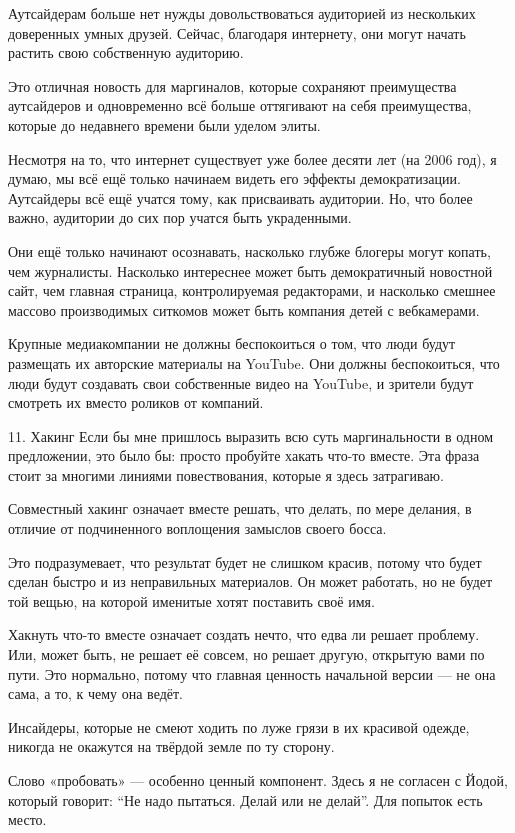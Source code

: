 \documentclass[ebook,12pt,oneside,openany]{memoir}
\begin{document}
Аутсайдерам больше нет нужды довольствоваться аудиторией из нескольких
доверенных умных друзей. Сейчас, благодаря интернету, они могут начать
растить свою собственную аудиторию.

Это отличная новость для маргиналов, которые сохраняют преимущества
аутсайдеров и одновременно всё больше оттягивают на себя преимущества,
которые до недавнего времени были уделом элиты.

Несмотря на то, что интернет существует уже более десяти лет (на 2006
год), я думаю, мы всё ещё только начинаем видеть его эффекты
демократизации. Аутсайдеры всё ещё учатся тому, как присваивать
аудитории. Но, что более важно, аудитории до сих пор учатся быть
украденными.

Они ещё только начинают осознавать, насколько глубже блогеры могут
копать, чем журналисты. Насколько интереснее может быть демократичный
новостной сайт, чем главная страница, контролируемая редакторами, и
насколько смешнее массово производимых ситкомов может быть компания
детей с вебкамерами.

Крупные медиакомпании не должны беспокоиться о том, что люди будут
размещать их авторские материалы на YouTube. Они должны беспокоиться,
что люди будут создавать свои собственные видео на YouTube, и зрители
будут смотреть их вместо роликов от компаний.

11. Хакинг Если бы мне пришлось выразить всю суть маргинальности в
одном предложении, это было бы: просто пробуйте хакать что-то вместе.
Эта фраза стоит за многими линиями повествования, которые я здесь
затрагиваю.

Совместный хакинг означает вместе решать, что делать, по мере делания,
в отличие от подчиненного воплощения замыслов своего босса.

Это подразумевает, что результат будет не слишком красив, потому что
будет сделан быстро и из неправильных материалов. Он может работать,
но не будет той вещью, на которой именитые хотят поставить своё имя.

Хакнуть что-то вместе означает создать нечто, что едва ли решает
проблему. Или, может быть, не решает её совсем, но решает другую,
открытую вами по пути. Это нормально, потому что главная ценность
начальной версии — не она сама, а то, к чему она ведёт.

Инсайдеры, которые не смеют ходить по луже грязи в их красивой одежде,
никогда не окажутся на твёрдой земле по ту сторону.

Слово «пробовать» — особенно ценный компонент. Здесь я не согласен с
Йодой, который говорит: “Не надо пытаться. Делай или не делай”. Для
попыток есть место.
\end{document}
